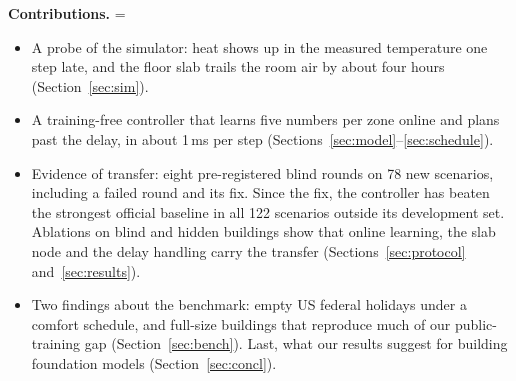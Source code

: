 \documentclass{article}
\makeatletter
\newenvironment{contriblist}{\@beginparpenalty=\@M\begin{itemize}\setlength{\itemsep}{1pt}}{\end{itemize}}
\makeatother
\begin{document}
\textbf{Contributions.}
\begin{contriblist}
\item A probe of the simulator: heat shows up in the measured temperature one step late, and the floor slab trails the
room air by about four hours (Section~\ref{sec:sim}).
\item A training-free controller that learns five numbers per zone online and plans past the delay, in about 1\,ms per
step (Sections~\ref{sec:model}--\ref{sec:schedule}).
\item Evidence of transfer: eight pre-registered blind rounds on 78 new scenarios, including a failed round and its
fix. Since the fix, the controller has beaten the strongest official baseline in all 122 scenarios outside its
development set. Ablations on blind and hidden buildings show that online learning, the slab node and the delay
handling carry the transfer (Sections~\ref{sec:protocol} and~\ref{sec:results}).
\item Two findings about the benchmark: empty US federal holidays under a comfort schedule, and full-size buildings
that reproduce much of our public-training gap (Section~\ref{sec:bench}). Last, what our results suggest for building
foundation models (Section~\ref{sec:concl}).
\end{contriblist}
\end{document}

